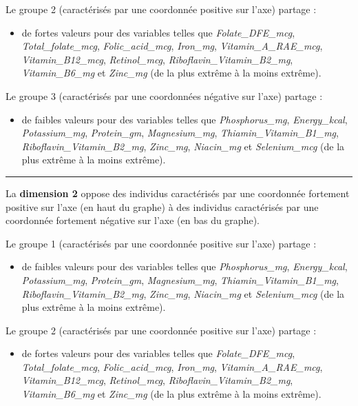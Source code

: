 \documentclass[]{article}
\providecommand{\tightlist}{%
  \setlength{\itemsep}{0pt}\setlength{\parskip}{0pt}}
\begin{document}
Le groupe 2 (caractérisés par une coordonnée positive sur l'axe) partage
:

\begin{itemize}
\tightlist
\item
  de fortes valeurs pour des variables telles que
  \emph{Folate\_DFE\_mcg}, \emph{Total\_folate\_mcg},
  \emph{Folic\_acid\_mcg}, \emph{Iron\_mg}, \emph{Vitamin\_A\_RAE\_mcg},
  \emph{Vitamin\_B12\_mcg}, \emph{Retinol\_mcg},
  \emph{Riboflavin\_Vitamin\_B2\_mg}, \emph{Vitamin\_B6\_mg} et
  \emph{Zinc\_mg} (de la plus extrême à la moins extrême).
\end{itemize}

Le groupe 3 (caractérisés par une coordonnées négative sur l'axe)
partage :

\begin{itemize}
\tightlist
\item
  de faibles valeurs pour des variables telles que
  \emph{Phosphorus\_mg}, \emph{Energy\_kcal}, \emph{Potassium\_mg},
  \emph{Protein\_gm}, \emph{Magnesium\_mg},
  \emph{Thiamin\_Vitamin\_B1\_mg}, \emph{Riboflavin\_Vitamin\_B2\_mg},
  \emph{Zinc\_mg}, \emph{Niacin\_mg} et \emph{Selenium\_mcg} (de la plus
  extrême à la moins extrême).
\end{itemize}

\begin{center}\rule{0.5\linewidth}{\linethickness}\end{center}

La \textbf{dimension 2} oppose des individus caractérisés par une
coordonnée fortement positive sur l'axe (en haut du graphe) à des
individus caractérisés par une coordonnée fortement négative sur l'axe
(en bas du graphe).

Le groupe 1 (caractérisés par une coordonnée positive sur l'axe) partage
:

\begin{itemize}
\tightlist
\item
  de faibles valeurs pour des variables telles que
  \emph{Phosphorus\_mg}, \emph{Energy\_kcal}, \emph{Potassium\_mg},
  \emph{Protein\_gm}, \emph{Magnesium\_mg},
  \emph{Thiamin\_Vitamin\_B1\_mg}, \emph{Riboflavin\_Vitamin\_B2\_mg},
  \emph{Zinc\_mg}, \emph{Niacin\_mg} et \emph{Selenium\_mcg} (de la plus
  extrême à la moins extrême).
\end{itemize}

Le groupe 2 (caractérisés par une coordonnée positive sur l'axe) partage
:

\begin{itemize}
\tightlist
\item
  de fortes valeurs pour des variables telles que
  \emph{Folate\_DFE\_mcg}, \emph{Total\_folate\_mcg},
  \emph{Folic\_acid\_mcg}, \emph{Iron\_mg}, \emph{Vitamin\_A\_RAE\_mcg},
  \emph{Vitamin\_B12\_mcg}, \emph{Retinol\_mcg},
  \emph{Riboflavin\_Vitamin\_B2\_mg}, \emph{Vitamin\_B6\_mg} et
  \emph{Zinc\_mg} (de la plus extrême à la moins extrême).
\end{itemize}
\end{document}
